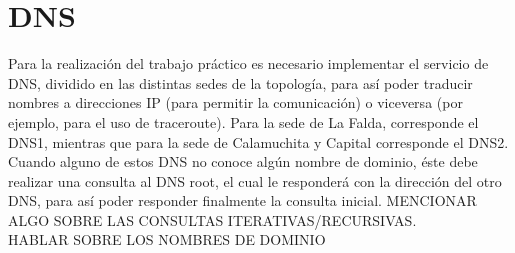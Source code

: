 \section{DNS}

Para la realización del trabajo práctico es necesario implementar el servicio de DNS, dividido en las distintas sedes de la topología, para así poder traducir nombres a direcciones IP (para permitir la comunicación) o viceversa (por ejemplo, para el uso de traceroute). Para la sede de La Falda, corresponde el DNS1, mientras que para la sede de Calamuchita y Capital corresponde el DNS2. \\
Cuando alguno de estos DNS no conoce algún nombre de dominio, éste debe realizar una consulta al DNS root, el cual le responderá con la dirección del otro DNS, para así poder responder finalmente la consulta inicial. MENCIONAR ALGO SOBRE LAS CONSULTAS ITERATIVAS/RECURSIVAS.\\
HABLAR SOBRE LOS NOMBRES DE DOMINIO
